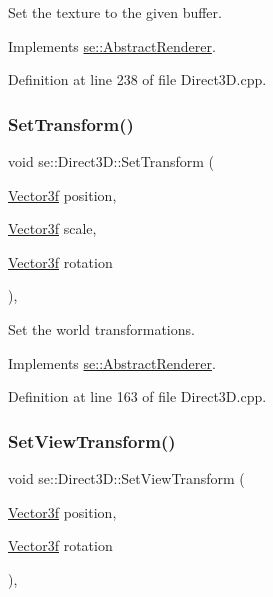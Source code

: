 Set the texture to the given buffer. 

Implements \mbox{\hyperlink{classse_1_1_abstract_renderer_aa7fc2284df16ba0b42059560599ff013}{se\+::\+Abstract\+Renderer}}.



Definition at line 238 of file Direct3\+D.\+cpp.

\mbox{\label{classse_1_1_direct3_d_a87c8a92e7b236a2f80f29008f22ccc8e}} 
\subsubsection{\texorpdfstring{Set\+Transform()}{SetTransform()}}
{\footnotesize\ttfamily void se\+::\+Direct3\+D\+::\+Set\+Transform (\begin{DoxyParamCaption}\item[{\mbox{\hyperlink{namespacese_a12e07512d95e2fdebdaf74a5ea2cf5f6}{Vector3f}}}]{position,  }\item[{\mbox{\hyperlink{namespacese_a12e07512d95e2fdebdaf74a5ea2cf5f6}{Vector3f}}}]{scale,  }\item[{\mbox{\hyperlink{namespacese_a12e07512d95e2fdebdaf74a5ea2cf5f6}{Vector3f}}}]{rotation }\end{DoxyParamCaption})\hspace{0.3cm}{\ttfamily [override]}, {\ttfamily [virtual]}}

Set the world transformations. 

Implements \mbox{\hyperlink{classse_1_1_abstract_renderer_afe47dd77096e92a25260cacb50631d8f}{se\+::\+Abstract\+Renderer}}.



Definition at line 163 of file Direct3\+D.\+cpp.

\mbox{\label{classse_1_1_direct3_d_a0294b31c151540af98c78d1e33cb369a}} 
\subsubsection{\texorpdfstring{Set\+View\+Transform()}{SetViewTransform()}}
{\footnotesize\ttfamily void se\+::\+Direct3\+D\+::\+Set\+View\+Transform (\begin{DoxyParamCaption}\item[{\mbox{\hyperlink{namespacese_a12e07512d95e2fdebdaf74a5ea2cf5f6}{Vector3f}}}]{position,  }\item[{\mbox{\hyperlink{namespacese_a12e07512d95e2fdebdaf74a5ea2cf5f6}{Vector3f}}}]{rotation }\end{DoxyParamCaption})\hspace{0.3cm}{\ttfamily [override]}, {\ttfamily [virtual]}}


